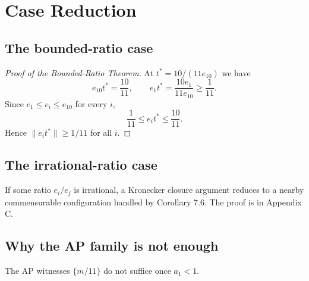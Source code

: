 \documentclass[12pt]{article}
\begin{document}
\section{Case Reduction}

\subsection{The bounded-ratio case}

\begin{proof}[Proof of the Bounded-Ratio Theorem]
At $t^*=10/(11e_{10})$ we have
\[
e_{10}t^* = \frac{10}{11},\qquad e_1 t^* = \frac{10e_1}{11e_{10}} \ge \frac{1}{11}.
\]
Since $e_1\le e_i\le e_{10}$ for every $i$,
\[
\frac{1}{11}\le e_i t^*\le \frac{10}{11}.
\]
Hence $\|e_i t^*\|\ge 1/11$ for all $i$.
\end{proof}

\subsection{The irrational-ratio case}

If some ratio $e_i/e_j$ is irrational, a Kronecker closure argument reduces to a nearby
commensurable configuration handled by Corollary 7.6. The proof is in Appendix C.

\subsection{Why the AP family is not enough}

The AP witnesses $\{m/11\}$ do not suffice once $a_1<1$.
\end{document}
